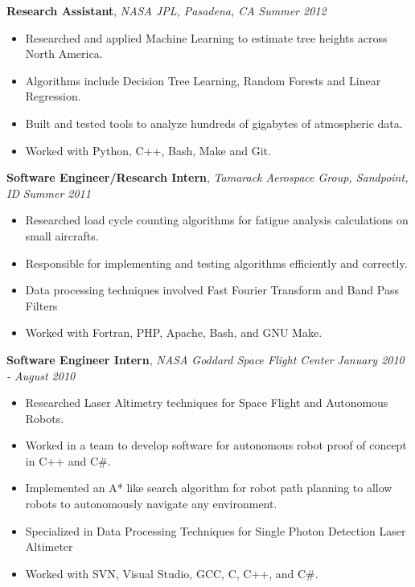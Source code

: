 \documentclass[9pt]{article}
\newenvironment{changemargin}[2]{%
  \begin{list}{}{%
    \setlength{\topsep}{0pt}%
    \setlength{\leftmargin}{#1}%
    \setlength{\rightmargin}{#2}%
    \setlength{\listparindent}{\parindent}%
    \setlength{\itemindent}{\parindent}%
    \setlength{\parsep}{\parskip}%
  }%
  \item[]}{\end{list}
}
\newenvironment{body} {
    \vspace*{-16pt}
    \begin{changemargin}{-0.20in}{-0.5in}
  }
    {\end{changemargin}
}
\begin{document}
\begin{body}
    \textbf{Research Assistant}, \emph{NASA JPL, Pasadena, CA} \hfill \emph{Summer 2012}\\
    \vspace*{-4pt}
    \begin{itemize} \itemsep -0pt  %
        \item Researched and applied Machine Learning to estimate tree heights across North America.
        \item Algorithms include Decision Tree Learning, Random Forests and Linear Regression.
        \item Built and tested tools to analyze hundreds of gigabytes of atmospheric data.
        \item Worked with Python, C++, Bash, Make and Git.
    \end{itemize}

    \textbf{Software Engineer/Research Intern}, \emph{Tamarack Aerospace Group, Sandpoint, ID} \hfill \emph{Summer 2011}\\
    \vspace*{-4pt}
    \begin{itemize} \itemsep -0pt  %
        \item Researched load cycle counting algorithms for fatigue analysis calculations on small aircrafts.
        \item Responsible for implementing and testing algorithms efficiently and correctly.
        \item Data processing techniques involved Fast Fourier Transform and Band Pass Filters
        \item Worked with Fortran, PHP, Apache, Bash, and GNU Make.
    \end{itemize}

    \textbf {Software Engineer Intern}, \emph{NASA Goddard Space Flight Center} \hfill \emph{January 2010 - August 2010}\\
    \vspace*{-4pt}
    \begin{itemize} \itemsep -0pt  %
        \item Researched Laser Altimetry techniques for Space Flight and Autonomous Robots.
        \item Worked in a team to develop software for autonomous robot proof of concept in C++ and C\#.
        \item Implemented an A* like search algorithm for robot path planning to allow robots to autonomously navigate any environment.
        \item Specialized in Data Processing Techniques for Single Photon Detection Laser Altimeter
        \item Worked with SVN, Visual Studio, GCC, C, C++, and C\#.
    \end{itemize}

\end{body}
\end{document}

